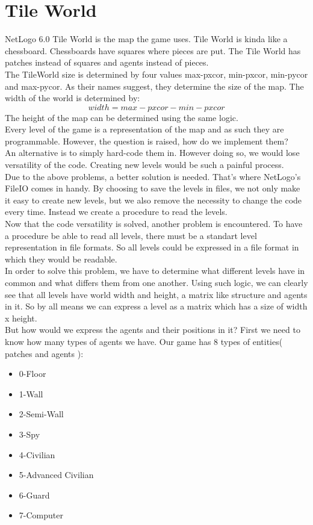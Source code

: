 \documentclass[12pt]{article}
\begin{document}
\section{Tile World}
NetLogo 6.0 Tile World is the map the game uses. Tile World is kinda like a chessboard. Chessboards have squares where pieces are put. The Tile World has patches instead of squares and agents instead of pieces.\\
The TileWorld size is determined by four values  max-pxcor, min-pxcor, min-pycor and max-pycor. As their names suggest, they determine the size of the map. The width of the world is determined by: $$ width = max-pxcor - min-pxcor $$ 
The height of the map can be determined using the same logic.\\
Every level of the game is a representation of the map and as such they are programmable. However, the question is raised, how do we implement them?\\
An alternative is to simply hard-code them in. However doing so, we would lose versatility of the code. Creating new levels would be such a painful process.\\
Due to the above problems, a better solution is needed. That's where NetLogo's FileIO comes in handy. By choosing to save the levels in files, we not only make it easy to create new levels, but we also remove the necessity to change the code every time. Instead we create a procedure to read the levels.\\
Now that the code versatility is solved, another problem is encountered. To have a procedure be able to read all levels, there must be a standart level representation in file formats. So all levels could be expressed in a file format in which they would be readable.\\
In order to solve this problem, we have to determine what different levels have in common and what differs them from one another. Using such logic, we can clearly see that all levels have world width and height, a matrix like structure and agents in it. So by all means we can express a level as a matrix which has a size of width x height.\\
But how would we express the agents and their positions in it? First we need to know how many types of agents we have. Our game has 8 types of entities( patches and agents ):
\newpage
\begin{itemize}
\item 0-Floor
\item 1-Wall
\item 2-Semi-Wall
\item 3-Spy
\item 4-Civilian
\item 5-Advanced Civilian
\item 6-Guard
\item 7-Computer
\end{itemize}
\end{document}
